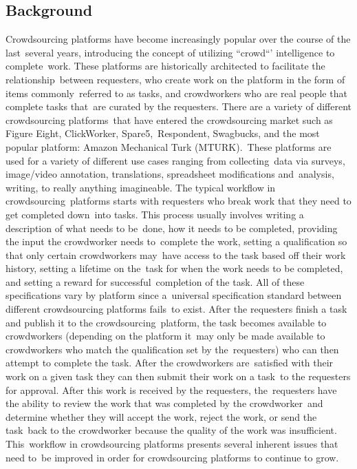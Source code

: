 \documentclass[letterpaper,12pt]{article}
\begin{document}
\subsection{Background}
Crowdsourcing platforms have become increasingly popular over the course of the last\ 
several years, introducing the concept of utilizing ``crowd``' intelligence to complete\
work. \cite{kuek2015global} These platforms are historically architected to facilitate the relationship\ 
between requesters, who create work on the platform in the form of items commonly\ 
referred to as tasks, and crowdworkers who are real people that complete tasks that\ 
are curated by the requesters. There are a variety of different crowdsourcing platforms\ 
that have entered the crowdsourcing market such as Figure Eight, ClickWorker, Spare5,\ 
Respondent, Swagbucks, and the most popular platform: Amazon Mechanical Turk (MTURK).\ 
These platforms are used for a variety of different use cases ranging from collecting\
data via surveys, image/video annotation, translations, spreadsheet modifications and\ 
analysis, writing, to really anything imagineable. The typical workflow in crowdsourcing\ 
platforms starts with requesters who break work that they need to get completed down\ 
into tasks. This process usually involves writing a description of what needs to be\ 
 done, how it needs to be completed, providing the input the crowdworker needs to\ 
 complete the work, setting a qualification so that only certain crowdworkers may\ 
 have access to the task based off their work history, setting a lifetime on the\ 
  task for when the work needs to be completed, and setting a reward for successful\ 
  completion of the task. All of these specifications vary by platform since a\ 
  universal specification standard between different crowdsourcing platforms fails\ 
  to exist. After the requesters finish a task and publish it to the crowdsourcing\ 
  platform, the task becomes available to crowdworkers (depending on the platform it\ 
  may only be made available to crowdworkers who match the qualification set by the\ 
  requesters) who can then attempt to complete the task. After the crowdworkers are\ 
  satisfied with their work on a given task they can then submit their work on a task\ 
  to the requesters for approval. After this work is received by the requesters, the\ 
  requesters have the ability to review the work that was completed by the crowdworker\
   and determine whether they will accept the work, reject the work, or send the task\ 
   back to the crowdworker because the quality of the work was insufficient. This\ 
   workflow in crowdsourcing platforms presents several inherent issues that need to\ 
   be improved in order for crowdsourcing platforms to continue to grow.
\end{document}
